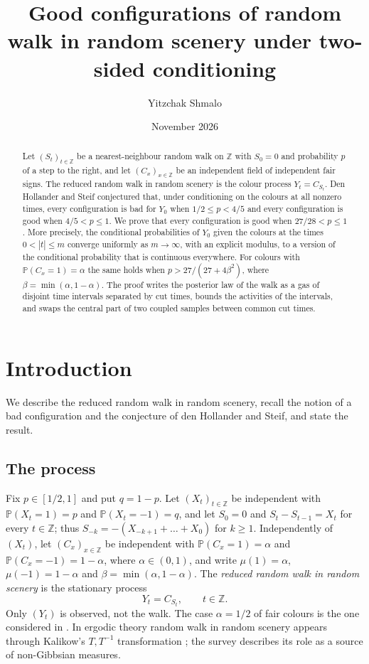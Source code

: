 \documentclass[11pt]{amsart}
\title[Two-sided conditioning in random walk in random scenery]{Good configurations of random walk in random scenery
under two-sided conditioning}
\author{Yitzchak Shmalo}
\date{November 2026}
\theoremstyle{remark}
\newcommand{\Z}{\mathbb{Z}}
\newcommand{\PP}{\mathbb{P}}
\begin{document}
\begin{abstract}
Let $(S_t)_{t\in\Z}$ be a nearest-neighbour random walk on $\Z$ with $S_0=0$ and probability $p$ of a step to the
right, and let $(C_x)_{x\in\Z}$ be an independent field of independent fair signs. The reduced random walk in random
scenery is the colour process $Y_t=C_{S_t}$. Den Hollander and Steif conjectured that, under conditioning on the
colours at all nonzero times, every configuration is bad for $Y_0$ when $1/2\le p<4/5$ and every configuration is good
when $4/5<p\le1$. We prove that every configuration is good when $27/28<p\le1$. More precisely, the conditional
probabilities of $Y_0$ given the colours at the times $0<|t|\le m$ converge uniformly as $m\to\infty$, with an explicit
modulus, to a version of the conditional probability that is continuous everywhere. For colours with $\PP(C_x=1)=\alpha$
the same holds when $p>27/(27+4\beta^2)$, where $\beta=\min(\alpha,1-\alpha)$. The proof writes the posterior law of
the walk as a gas of disjoint time intervals separated by cut times, bounds the activities of the intervals, and swaps
the central part of two coupled samples between common cut times.
\end{abstract}
\maketitle

\section{Introduction}\label{sec:intro}

We describe the reduced random walk in random scenery, recall the notion of a bad configuration and the conjecture of
den Hollander and Steif, and state the result.

\subsection{The process}
Fix $p\in[1/2,1]$ and put $q=1-p$. Let $(X_t)_{t\in\Z}$ be independent with $\PP(X_t=1)=p$ and $\PP(X_t=-1)=q$, and let
$S_0=0$ and $S_t-S_{t-1}=X_t$ for every $t\in\Z$; thus $S_{-k}=-(X_{-k+1}+\dots+X_0)$ for $k\ge1$. Independently of
$(X_t)$, let $(C_x)_{x\in\Z}$ be independent with $\PP(C_x=1)=\alpha$ and $\PP(C_x=-1)=1-\alpha$, where
$\alpha\in(0,1)$, and write $\mu(1)=\alpha$, $\mu(-1)=1-\alpha$ and $\beta=\min(\alpha,1-\alpha)$. The \emph{reduced
random walk in random scenery} is the stationary process
\[
Y_t=C_{S_t},\qquad t\in\Z.
\]
Only $(Y_t)$ is observed, not the walk. The case $\alpha=1/2$ of fair colours is the one considered in
\cite{dHS06}. In ergodic theory random walk in random scenery appears through Kalikow's $T,T^{-1}$ transformation \cite{Kal82}; the
survey \cite{dHS06} describes its role as a source of non-Gibbsian measures.
\end{document}
